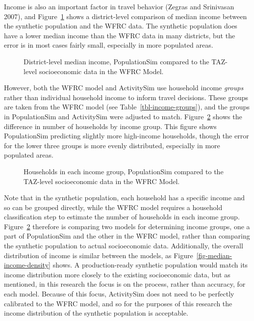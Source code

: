 \documentclass[fancy, twoside, mastersfancy, ms]{byuthesis}
\begin{document}
Income is also an important factor in travel behavior (Zegras and
Srinivasan 2007), and Figure~\ref{fig-median-income-comparison} shows a
district-level comparison of median income between the synthetic
population and the WFRC data. The synthetic population does have a lower
median income than the WFRC data in many districts, but the error is in
most cases fairly small, especially in more populated areas.

\begin{figure}


\caption{\label{fig-median-income-comparison}District-level median
income, PopulationSim compared to the TAZ-level socioeconomic data in
the WFRC Model.}

\end{figure}%

However, both the WFRC model and ActivitySim use household income
\emph{groups} rather than individual household income to inform travel
decisions. These groups are taken from the WFRC model (see
Table~\ref{tbl-income-groups}), and the groups in PopulationSim and
ActivitySim were adjusted to match. Figure~\ref{fig-income-group-map}
shows the difference in number of households by income group. This
figure shows PopulationSim predicting slightly more high-income
households, though the error for the lower three groups is more evenly
distributed, especially in more populated areas.

\begin{figure}


\caption{\label{fig-income-group-map}Households in each income group,
PopulationSim compared to the TAZ-level socioeconomic data in the WFRC
Model.}

\end{figure}%

Note that in the synthetic population, each household has a specific
income and so can be grouped directly, while the WFRC model requires a
household classification step to estimate the number of households in
each income group. Figure~\ref{fig-income-group-map} therefore is
comparing two models for determining income groups, one a part of
PopulationSim and the other in the WFRC model, rather than comparing the
synthetic population to actual socioeconomic data. Additionally, the
overall distribution of income is similar between the models, as
Figure~\ref{fig-median-income-density} shows. A production-ready
synthetic population would match its income distribution more closely to
the existing socioeconomic data, but as mentioned, in this research the
focus is on the process, rather than accuracy, for each model. Because
of this focus, ActivitySim does not need to be perfectly calibrated to
the WFRC model, and so for the purposes of this research the income
distribution of the synthetic population is acceptable.
\end{document}
